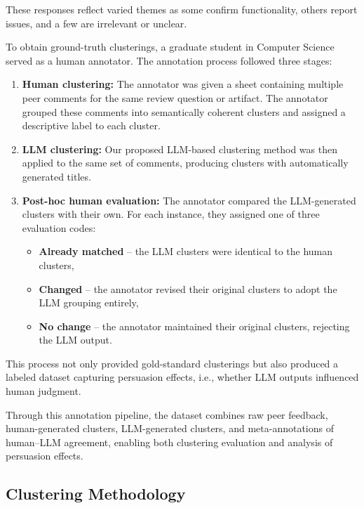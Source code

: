 \documentclass[manuscript,review, anonymous]{acmart}
\begin{document}
These responses reflect varied themes as some confirm functionality, others report issues, and a few are irrelevant or unclear.

To obtain ground-truth clusterings, a graduate student in Computer Science served as a human annotator. The annotation process followed three stages:

\begin{enumerate}
    \item \textbf{Human clustering:} The annotator was given a sheet containing multiple peer comments for the same review question or artifact. The annotator grouped these comments into semantically coherent clusters and assigned a descriptive label to each cluster.
    \item \textbf{LLM clustering:} Our proposed LLM-based clustering method was then applied to the same set of comments, producing clusters with automatically generated titles.
    \item \textbf{Post-hoc human evaluation:} The annotator compared the LLM-generated clusters with their own. For each instance, they assigned one of three evaluation codes:
    \begin{itemize}
        \item \textbf{Already matched} – the LLM clusters were identical to the human clusters,
        \item \textbf{Changed} – the annotator revised their original clusters to adopt the LLM grouping entirely,
        \item \textbf{No change} – the annotator maintained their original clusters, rejecting the LLM output.
    \end{itemize}
\end{enumerate}

This process not only provided gold-standard clusterings but also produced a labeled dataset capturing persuasion effects, i.e., whether LLM outputs influenced human judgment.




Through this annotation pipeline, the dataset combines raw peer feedback, human-generated clusters, LLM-generated clusters, and meta-annotations of human–LLM agreement, enabling both clustering evaluation and analysis of persuasion effects.





\subsection{Clustering Methodology}
\end{document}
